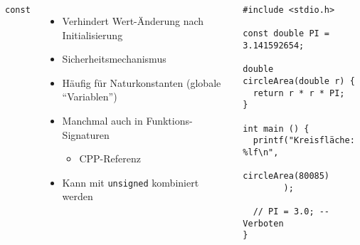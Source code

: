 \begin{frame}[fragile]
%
\begin{columns}[T]
\begin{Large}
{\texttt{const}}
\vspace{6pt}
\end{Large}
%
\begin{itemize}
\item Verhindert Wert-Änderung nach Initialisierung
\item Sicherheitsmechanismus
\item Häufig für Naturkonstanten (globale \enquote{Variablen})
\item Manchmal auch in Funktions-Signaturen
	\begin{itemize}
	\item CPP-Referenz
	\end{itemize}
\item Kann mit \texttt{unsigned} kombiniert werden
\end{itemize}
%
\begin{codebox}
\begin{verbatim}
#include <stdio.h>

const double PI = 3.141592654;

double circleArea(double r) {
  return r * r * PI;
}

int main () {
  printf("Kreisfläche: %lf\n", 
         circleArea(80085)
        );
  
  // PI = 3.0; -- Verboten
}
\end{verbatim}
\end{codebox}
\end{columns}
%
\end{frame}


